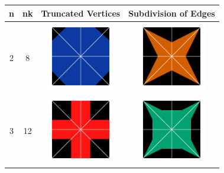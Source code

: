 \documentclass{beamer}
\begin{document}
\begin{frame}
\begin{table}
\centering
\begin{tabular}{c|c|c|c}
n & nk& Truncated Vertices & Subdivision of Edges\\\hline
2 & 8 & \includegraphics[width=3cm]{8tv}&\includegraphics[width=3cm]{8se} \\\hline
3 & 12 & \includegraphics[width=3cm]{12tv} &\includegraphics[width=3cm]{12se}\\\hline
\end{tabular}
\end{table}
\end{frame}
\end{document}
